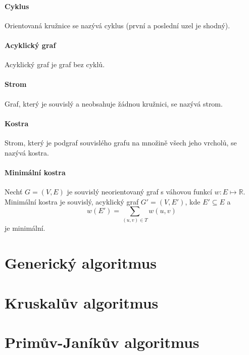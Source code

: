 \paragraph*{Cyklus} Orientovaná kružnice se nazývá cyklus (první a poslední uzel je shodný).


\paragraph*{Acyklický graf} Acyklický graf je graf bez cyklů.

\paragraph*{Strom} Graf, který je souvislý a neobsahuje žádnou kružnici, se nazývá strom.

\paragraph*{Kostra} Strom, který je podgraf souvislého grafu na množině všech jeho vrcholů, se nazývá kostra.

\paragraph*{Minimální kostra} Nechť $G = (V, E)$ je souvislý neorientovaný graf s váhovou funkcí $w : E \mapsto \mathbb{R}$. Minimální kostra je souvislý, acyklický graf $G' = (V, E')$, kde $E' \subseteq E$ a $$w(E') = \sum_{(u,v) \in T} w(u, v)$$ je minimální.

\section{Generický algoritmus}


\section{Kruskalův algoritmus}


\section{Primův-Janíkův algoritmus}

